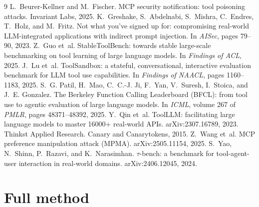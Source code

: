 \documentclass{article}
\begin{document}
\begin{thebibliography}{9}
\small
{} L.~Beurer-Kellner and M.~Fischer. MCP security notification: tool poisoning attacks. Invariant Labs, 2025.
 K.~Greshake, S.~Abdelnabi, S.~Mishra, C.~Endres, T.~Holz, and M.~Fritz. Not what you've signed up for: compromising real-world LLM-integrated applications with indirect prompt injection. In \emph{AISec}, pages 79--90, 2023.
 Z.~Guo et~al. StableToolBench: towards stable large-scale benchmarking on tool learning of large language models. In \emph{Findings of ACL}, 2025.
 J.~Lu et~al. ToolSandbox: a stateful, conversational, interactive evaluation benchmark for LLM tool use capabilities. In \emph{Findings of NAACL}, pages 1160--1183, 2025.
 S.~G. Patil, H.~Mao, C.~C.-J. Ji, F.~Yan, V.~Suresh, I.~Stoica, and J.~E. Gonzalez. The Berkeley Function Calling Leaderboard (BFCL): from tool use to agentic evaluation of large language models. In \emph{ICML}, volume 267 of \emph{PMLR}, pages 48371--48392, 2025.
 Y.~Qin et~al. ToolLLM: facilitating large language models to master 16000+ real-world APIs. arXiv:2307.16789, 2023.
 Thinkst Applied Research. Canary and Canarytokens, 2015.
 Z.~Wang et~al. MCP preference manipulation attack (MPMA). arXiv:2505.11154, 2025.
 S.~Yao, N.~Shinn, P.~Razavi, and K.~Narasimhan. $\tau$-bench: a benchmark for tool-agent-user interaction in real-world domains. arXiv:2406.12045, 2024.
\end{thebibliography}

\clearpage
\appendix

\section{Full method}
\label{app:method}
\end{document}
